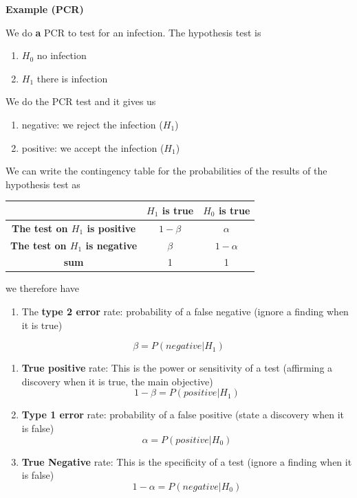 \documentclass[
]{book}
\providecommand{\tightlist}{%
  \setlength{\itemsep}{0pt}\setlength{\parskip}{0pt}}
\begin{document}
\textbf{Example (PCR)}

We do \textbf{a} PCR to test for an infection. The hypothesis test is

\begin{enumerate}
\def\labelenumi{\alph{enumi}.}
\tightlist
\item
  \(H_0\) no infection
\item
  \(H_1\) there is infection
\end{enumerate}

We do the PCR test and it gives us

\begin{enumerate}
\def\labelenumi{\roman{enumi}.}
\tightlist
\item
  negative: we reject the infection (\(H_1\))
\item
  positive: we accept the infection (\(H_1\))
\end{enumerate}

We can write the contingency table for the probabilities of the results of the hypothesis test as

\begin{longtable}[]{@{}ccc@{}}
\toprule\noalign{}
& \(H_1\) is true & \(H_0\) is true \\
\midrule\noalign{}
\endhead
\bottomrule\noalign{}
\endlastfoot
\textbf{The test on \(H_1\) is positive} & \(1-\beta\) & \(\alpha\) \\
\textbf{The test on \(H_1\) is negative} & \(\beta\) & \(1-\alpha\) \\
\textbf{sum} & 1 & 1 \\
\end{longtable}

we therefore have

\begin{enumerate}
\def\labelenumi{\arabic{enumi}.}
\tightlist
\item
  The \textbf{type 2 error} rate: probability of a false negative (ignore a finding when it is true)
\end{enumerate}

\[\beta=P(negative|H_1)\]

\begin{enumerate}
\def\labelenumi{\arabic{enumi}.}
\setcounter{enumi}{1}
\item
  \textbf{True positive} rate: This is the power or sensitivity of a test (affirming a discovery when it is true, the main objective)
  \[1-\beta=P(positive|H_1)\]
\item
  \textbf{Type 1 error} rate: probability of a false positive (state a discovery when it is false)
  \[\alpha=P(positive|H_0)\]
\item
  \textbf{True Negative} rate: This is the specificity of a test (ignore a finding when it is false)
  \[1-\alpha=P(negative|H_0)\]
\end{enumerate}
\end{document}
